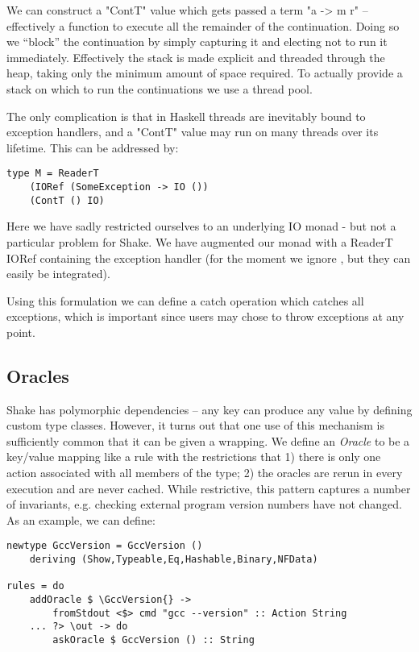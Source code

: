 We can construct a \lst"ContT" value which gets passed a term \lst"a -> m r" -- effectively a function to execute all the remainder of the continuation. Doing so we ``block'' the continuation by simply capturing it and electing not to run it immediately. Effectively the stack is made explicit and threaded through the heap, taking only the minimum amount of space required. To actually provide a stack on which to run the continuations we use a thread pool.

The only complication is that in Haskell threads are inevitably bound to exception handlers, and a \lst"ContT" value may run on many threads over its lifetime. This can be addressed by:

\begin{lstlisting}
type M = ReaderT
    (IORef (SomeException -> IO ())
    (ContT () IO)
\end{lstlisting}

Here we have sadly restricted ourselves to an underlying IO monad - but not a particular problem for Shake. We have augmented our monad with a ReaderT IORef containing the exception handler (for the moment we ignore \cite{extensible exceptions}, but they can easily be integrated).

Using this formulation we can define a catch operation which catches all exceptions, which is important since users may chose to throw exceptions at any point.

\subsection{Oracles}

Shake has polymorphic dependencies -- any key can produce any value by defining custom type classes. However, it turns out that one use of this mechanism is sufficiently common that it can be given a wrapping. We define an \textit{Oracle} to be a key/value mapping like a rule with the restrictions that 1) there is only one action associated with all members of the type; 2) the oracles are rerun in every execution and are never cached. While restrictive, this pattern captures a number of invariants, e.g. checking external program version numbers have not changed. As an example, we can define:

\begin{lstlisting}
newtype GccVersion = GccVersion ()
    deriving (Show,Typeable,Eq,Hashable,Binary,NFData)

rules = do
    addOracle $ \GccVersion{} ->
        fromStdout <$> cmd "gcc --version" :: Action String
    ... ?> \out -> do
        askOracle $ GccVersion () :: String
\end{lstlisting}

